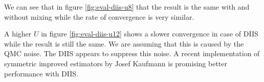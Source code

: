 We can see that in figure \ref{fig:eval-diis-u8} that the result is the same with and without mixing while the rate of convergence is very similar.

A higher $U$ in figure \ref{fig:eval-diis-u12} shows a slower convergence in case of DIIS while the result is still the same. We are assuming that this is caused by the QMC noise. The DIIS appears to suppress this noise. A recent implementation of symmetric improved estimators\cite{symmetric} by Josef Kaufmann is promising better performance with DIIS.

